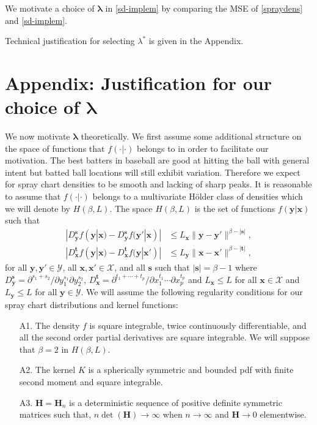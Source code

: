 \documentclass[11pt]{article}
\newcommand{\Y}{\mathcal{Y}}
\newcommand{\X}{\mathcal{X}}
\newcommand{\Hbf}{\textbf{H}}
\newcommand{\y}{\textbf{y}}
\newcommand{\x}{\textbf{x}}
\newcommand{\s}{\textbf{s}}
\newcommand{\tbf}{\textbf{t}}
\newcommand{\lamstar}{\lambda^{\textstyle{*}}}
\newcommand{\lambdabf}{\boldsymbol{\lambda}}
\begin{document}
We motivate a choice of $\lambdabf$ in \eqref{sd-implem} by comparing the MSE of \eqref{spraydens} and \eqref{sd-implem}. 

Technical justification for selecting $\lamstar$ is given in the Appendix.



\section*{Appendix: Justification for our choice of $\lambdabf$}

We now motivate $\lambdabf$ theoretically. We first assume some additional structure on the space of functions that $f(\cdot|\cdot)$ belongs to in order to facilitate our motivation. The best batters in baseball are good at hitting the ball with general intent but batted ball locations will still exhibit variation. Therefore we expect for spray chart densities to be smooth and lacking of sharp peaks. It is reasonable to assume that $f(\cdot|\cdot)$ belongs to a multivariate H{\"o}lder class of densities which we will denote by $H(\beta,L)$. The space $H(\beta,L)$ is the set of functions $f(\y|\x)$ such that 
\begin{align*}
|D_{\y}^\s f(\y|\x) - D_{\y}^\s f(\y'|\x)| &\leq L_\x\|\y - \y'\|^{\beta - |\s|}, \\
|D_{\x}^\tbf f(\y|\x) - D_{\x}^\tbf f(\y|\x')| &\leq L_\y\|\x - \x'\|^{\beta - |\tbf|}, 
\end{align*}
for all $\y,\y' \in \Y$, all $\x,\x' \in \X$, and all $\s$ such that $|\s| = \beta - 1$ where
$D_{\y}^\s = \partial^{s_1 + s_2}/\partial y_1^{s_1} \partial y_2^{s_2}$, 
$D_{\x}^\tbf = \partial^{t_1 + \cdots + t_p}/\partial x_1^{t_1} \cdots \partial x_p^{t_p}$ and $L_\x \leq L$ for all $\x \in \X$ and $L_\y \leq L$ for all $\y \in \Y$. 
We will assume the following regularity conditions for our spray chart distributions and kernel functions: 

\begin{itemize}
\item[A1.] The density $f$ is square integrable, twice continuously differentiable, and all the second order partial derivatives are square integrable. We will suppose that $\beta = 2$ in $H(\beta,L)$.
\item[A2.] The kernel $K$ is a spherically symmetric and bounded pdf with finite second moment and square integrable.
\item[A3.] $\Hbf = \Hbf_n$ is a deterministic sequence of positive definite symmetric matrices such that, $n\det(\Hbf) \to \infty$ when $n \to \infty$ and $\Hbf \to 0$ elementwise. 
\end{itemize}
\end{document}
